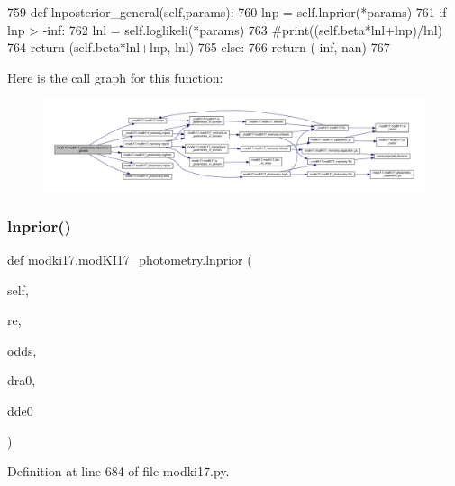 \begin{DoxyCode}
759     \textcolor{keyword}{def }lnposterior\_general(self,params):
760         lnp = self.lnprior(*params)
761         \textcolor{keywordflow}{if} lnp > -inf:
762             lnl = self.loglikeli(*params) 
763             \textcolor{comment}{#print((self.beta*lnl+lnp)/lnl)}
764             \textcolor{keywordflow}{return} (self.beta*lnl+lnp, lnl)
765         \textcolor{keywordflow}{else}:
766             \textcolor{keywordflow}{return} (-inf, nan)
767 \end{DoxyCode}
Here is the call graph for this function\+:\nopagebreak
\begin{figure}[H]
\begin{center}
\leavevmode
\includegraphics[width=350pt]{dd/db2/classmodki17_1_1modKI17__photometry_ad1288aa45a1823113ff486133a5f7fa9_cgraph}
\end{center}
\end{figure}
\mbox{\label{classmodki17_1_1modKI17__photometry_a857286f3245038e653c739b35c4988e8}} 
\subsubsection{\texorpdfstring{lnprior()}{lnprior()}}
{\footnotesize\ttfamily def modki17.\+mod\+K\+I17\+\_\+photometry.\+lnprior (\begin{DoxyParamCaption}\item[{}]{self,  }\item[{}]{re,  }\item[{}]{odds,  }\item[{}]{dra0,  }\item[{}]{dde0 }\end{DoxyParamCaption})}



Definition at line 684 of file modki17.\+py.



